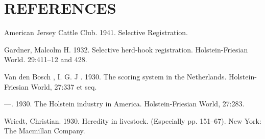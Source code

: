 \section*{REFERENCES}
\begin{hangparas}{0.5in}{1}%
American Jersey Cattle Club. 1941. Selective Registration.

Gardner, Malcolm H. 1932. Selective herd-hook registration. Holstein-Friesian
World. 29:411--12 and 428.

Van den Bosch , I. G. J . 1930. The scoring system in the Netherlands. Holstein-Friesian
World, 27:337 et seq.

---. 1930. The Holstein industry in America. Holstein-Friesian World, 27:283.

Wriedt, Christian. 1930. Heredity in livestock. (Especially pp. 151--67). New York:
The Macmillan Company.
\end{hangparas}
